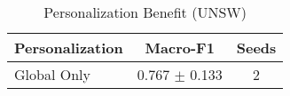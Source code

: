 \begin{table}[htbp]
\centering
\caption{Personalization Benefit (UNSW)}\label{tab:pers_unsw}
\begin{tabular}{lcc}
\toprule
Personalization & Macro-F1 & Seeds \\
\midrule
Global Only & 0.767 $\pm$ 0.133 & 2 \\
\bottomrule
\end{tabular}
\end{table}
